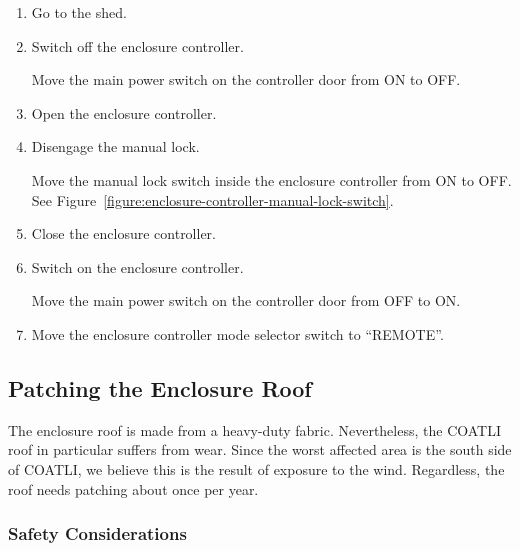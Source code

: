 \begin{enumerate}
\item
Go to the shed.

\item Switch off the enclosure controller.

Move the main power switch on the controller door from ON to OFF.

\item Open the enclosure controller.

\item
Disengage the manual lock.

Move the manual lock switch inside the enclosure controller from ON to OFF. See Figure~\ref{figure:enclosure-controller-manual-lock-switch}.

\item
Close the enclosure controller.

\item Switch on the enclosure controller.

Move the main power switch on the controller door from OFF to ON.

\item Move the enclosure controller mode selector switch to “REMOTE”.

\end{enumerate}

\subsection{Patching the Enclosure Roof}

The enclosure roof is made from a heavy-duty fabric. Nevertheless, the COATLI roof in particular suffers from wear. Since the worst affected area is the south side of COATLI, we believe this is the result of exposure to the wind. Regardless, the roof needs patching about once per year.

\subsubsection{Safety Considerations}




